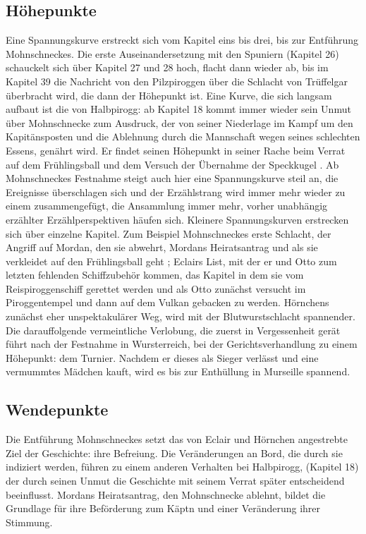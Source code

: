 {\subsection{Höhepunkte}
Eine Spannungskurve erstreckt sich vom Kapitel eins bis drei, bis zur Entführung Mohnschneckes. Die erste Auseinandersetzung mit den Spuniern (Kapitel 26) schauckelt sich über Kapitel 27 und 28 hoch, flacht dann wieder ab, bis im Kapitel 39 die Nachricht von den Pilzpiroggen über die Schlacht von Trüffelgar überbracht wird, die dann der Höhepunkt ist. Eine Kurve, die sich langsam aufbaut ist die von Halbpirogg: ab Kapitel 18 kommt immer wieder sein Unmut über Mohnschnecke zum Ausdruck, der von seiner Niederlage im Kampf um den Kapitänsposten und die Ablehnung durch die Mannschaft wegen seines schlechten Essens,  genährt wird. Er findet seinen Höhepunkt in seiner Rache beim Verrat auf dem Frühlingsball und dem Versuch der Übernahme der Speckkugel . Ab Mohnschneckes Festnahme steigt auch hier eine Spannungskurve steil an, die Ereignisse überschlagen sich und der Erzählstrang wird immer mehr wieder zu einem zusammengefügt, die Ansammlung immer mehr, vorher unabhängig erzählter Erzählperspektiven häufen sich. Kleinere Spannungskurven erstrecken sich über einzelne Kapitel. Zum Beispiel Mohnschneckes erste Schlacht, der Angriff auf Mordan, den sie abwehrt, Mordans Heiratsantrag und als sie verkleidet auf den Frühlingsball geht ; Eclairs List, mit der er und Otto zum letzten fehlenden Schiffzubehör kommen, das Kapitel in dem sie vom Reispiroggenschiff gerettet werden und als Otto zunächst versucht im Piroggentempel und dann auf dem Vulkan gebacken zu werden. Hörnchens zunächst eher unspektakulärer Weg, wird mit der Blutwurstschlacht spannender. Die darauffolgende vermeintliche Verlobung, die zuerst in Vergessenheit gerät führt nach der Festnahme in Wursterreich, bei der Gerichtsverhandlung zu einem Höhepunkt: dem Turnier. Nachdem er dieses als Sieger verlässt und eine vermummtes Mädchen kauft, wird es bis zur Enthüllung in Murseille spannend.

\subsection{Wendepunkte}

Die Entführung Mohnschneckes setzt das von Eclair und Hörnchen angestrebte Ziel der Geschichte: ihre Befreiung.  Die Veränderungen an Bord, die durch sie indiziert werden, führen zu einem anderen Verhalten bei Halbpirogg, (Kapitel 18) der durch seinen Unmut die Geschichte mit seinem Verrat später entscheidend beeinflusst. Mordans Heiratsantrag, den Mohnschnecke ablehnt, bildet die Grundlage für ihre Beförderung zum Käptn und einer Veränderung ihrer Stimmung. 

}
